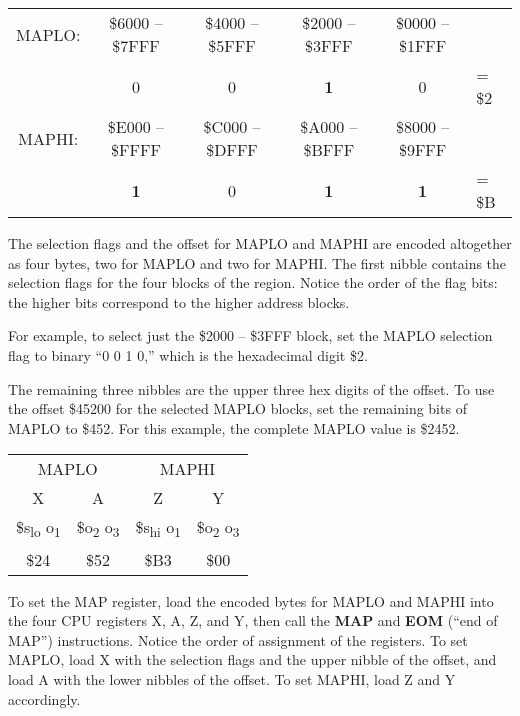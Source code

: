 \begin{center}
\begin{tabular}{c|c|c|c|c|l}
MAPLO: & \$6000 -- \$7FFF & \$4000 -- \$5FFF & \$2000 -- \$3FFF & \$0000 --
\$1FFF & \\
& 0 & 0 & {\bf 1} & 0 & = \$2 \\
\hline
MAPHI: & \$E000 -- \$FFFF & \$C000 -- \$DFFF & \$A000 -- \$BFFF & \$8000 --
\$9FFF & \\
& {\bf 1} & 0 & {\bf 1} & {\bf 1} & = \$B \\
\end{tabular}
\end{center}

The selection flags and the offset for MAPLO and MAPHI are encoded altogether
as four bytes, two for MAPLO and two for MAPHI. The first nibble contains the
selection flags for the four blocks of the region. Notice the order of the
flag bits: the higher bits correspond to the higher address blocks.

For example, to select just the \$2000 -- \$3FFF block, set the MAPLO selection
flag to binary ``0 0 1 0,'' which is the hexadecimal digit \$2.

The remaining three nibbles are the upper three hex digits of the
offset. To use the offset \$45200 for the selected MAPLO blocks, set the
remaining bits of MAPLO to \$452. For this example, the complete MAPLO value is
\$2452.

\begin{center}
\begin{tabular}{cc|cc}
\multicolumn{2}{c}{MAPLO} & \multicolumn{2}{c}{MAPHI} \\
X & A & Z & Y \\
\hline
\$s\textsubscript{lo} o\textsubscript{1} &
\$o\textsubscript{2} o\textsubscript{3} &
\$s\textsubscript{hi} o\textsubscript{1} &
\$o\textsubscript{2} o\textsubscript{3} \\
\hline
\$24 & \$52 & \$B3 & \$00 \\
\end{tabular}
\end{center}

To set the MAP register, load the encoded bytes for MAPLO and MAPHI into the four CPU
registers X, A, Z, and Y, then call the {\bf MAP} and {\bf EOM} (``end of MAP'')
instructions. Notice the order of assignment of the registers. To set MAPLO, load X
with the selection flags and the upper nibble of the offset, and load A with the lower
nibbles of the offset. To set MAPHI, load Z and Y accordingly.

